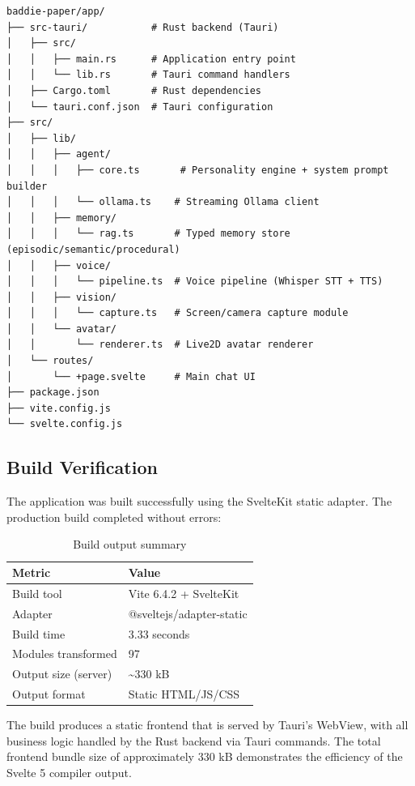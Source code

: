 \documentclass[sigconf]{acmart}
\begin{document}
\begin{verbatim}
baddie-paper/app/
├── src-tauri/           # Rust backend (Tauri)
│   ├── src/
│   │   ├── main.rs      # Application entry point
│   │   └── lib.rs       # Tauri command handlers
│   ├── Cargo.toml       # Rust dependencies
│   └── tauri.conf.json  # Tauri configuration
├── src/
│   ├── lib/
│   │   ├── agent/
│   │   │   ├── core.ts       # Personality engine + system prompt builder
│   │   │   └── ollama.ts    # Streaming Ollama client
│   │   ├── memory/
│   │   │   └── rag.ts       # Typed memory store (episodic/semantic/procedural)
│   │   ├── voice/
│   │   │   └── pipeline.ts  # Voice pipeline (Whisper STT + TTS)
│   │   ├── vision/
│   │   │   └── capture.ts   # Screen/camera capture module
│   │   └── avatar/
│   │       └── renderer.ts  # Live2D avatar renderer
│   └── routes/
│       └── +page.svelte     # Main chat UI
├── package.json
├── vite.config.js
└── svelte.config.js
\end{verbatim}

\subsection{Build Verification}

The application was built successfully using the SvelteKit static adapter. The production build completed without errors:

\begin{table}[htbp]
    \centering
    \caption{Build output summary}
    \label{tab:build}
    \begin{tabular}{@{}ll@{}}
        \toprule
        \textbf{Metric} & \textbf{Value} \\
        \midrule
        Build tool & Vite 6.4.2 + SvelteKit \\
        Adapter & @sveltejs/adapter-static \\
        Build time & 3.33 seconds \\
        Modules transformed & 97 \\
        Output size (server) & \textasciitilde 330 kB \\
        Output format & Static HTML/JS/CSS \\
        \bottomrule
    \end{tabular}
\end{table}

The build produces a static frontend that is served by Tauri's WebView, with all business logic handled by the Rust backend via Tauri commands. The total frontend bundle size of approximately 330 kB demonstrates the efficiency of the Svelte 5 compiler output.
\end{document}
